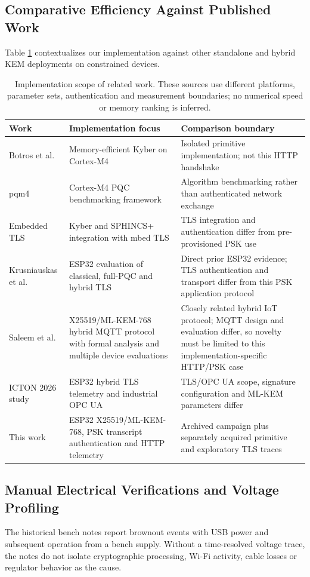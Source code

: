\documentclass[journal, 10pt]{IEEEtran}
\begin{document}
\subsection{Comparative Efficiency Against Published Work}
Table \ref{tab:comparison} contextualizes our implementation against other standalone and hybrid KEM deployments on constrained devices.

\begin{table}[htbp]
\centering
\caption{Implementation scope of related work. These sources use different platforms, parameter sets, authentication and measurement boundaries; no numerical speed or memory ranking is inferred.}
\begin{tabularx}{\textwidth}{lXX}
\toprule
\textbf{Work} & \textbf{Implementation focus} & \textbf{Comparison boundary} \\
\midrule
Botros et al.~\cite{b6} & Memory-efficient Kyber on Cortex-M4 & Isolated primitive implementation; not this HTTP handshake \\
pqm4~\cite{b7} & Cortex-M4 PQC benchmarking framework & Algorithm benchmarking rather than authenticated network exchange \\
Embedded TLS~\cite{b11} & Kyber and SPHINCS+ integration with mbed TLS & TLS integration and authentication differ from pre-provisioned PSK use \\
Krusniauskas et al.~\cite{b45} & ESP32 evaluation of classical, full-PQC and hybrid TLS & Direct prior ESP32 evidence; TLS authentication and transport differ from this PSK application protocol \\
Saleem et al.~\cite{b46} & X25519/ML-KEM-768 hybrid MQTT protocol with formal analysis and multiple device evaluations & Closely related hybrid IoT protocol; MQTT design and evaluation differ, so novelty must be limited to this implementation-specific HTTP/PSK case \\
ICTON 2026 study~\cite{b47} & ESP32 hybrid TLS telemetry and industrial OPC UA & TLS/OPC UA scope, signature configuration and ML-KEM parameters differ \\
This work & ESP32 X25519/ML-KEM-768, PSK transcript authentication and HTTP telemetry & Archived campaign plus separately acquired primitive and exploratory TLS traces \\
\bottomrule
\end{tabularx}
\label{tab:comparison}
\end{table}

\subsection{Manual Electrical Verifications and Voltage Profiling}
The historical bench notes report brownout events with USB power and subsequent operation from a bench supply. Without a time-resolved voltage trace, the notes do not isolate cryptographic processing, Wi-Fi activity, cable losses or regulator behavior as the cause.
\end{document}
